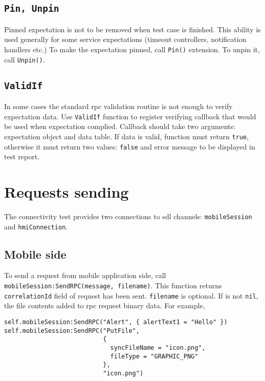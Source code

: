 \documentclass{article}
\begin{document}
\subsection{\tt Pin, Unpin}
Pinned expectation is not to be removed when test case is finished.
This ability is used generally for some service expectations (timeout controllers,
notification handlers etc.)
To make the expectation pinned, call {\tt Pin()} extension.
To unpin it, call {\tt Unpin()}.
\subsection{\tt ValidIf}
In some cases the standard {\sc rpc} validation routine is not enough to verify
expectation data.
Use {\tt ValidIf} function to register verifying callback that would be used
when expectation complied.
Callback should take two arguments: expectation object and data table.
If data is valid, function must return {\tt true}, otherwise it must return
two values: {\tt false} and error message to be displayed in test report.
\section{Requests sending}
The connectivity test provides two connections to {\sc sdl} channels:
{\tt mobileSession} and {\tt hmiConnection}.

\subsection{Mobile side}
To send a request from mobile application side, call
{\tt mobileSession:SendRPC(message, filename)}.
This function returns {\tt correlationId} field of request has been sent.
{\tt filename} is optional.
If is not {\tt nil}, the file contents added to {\sc rpc} request binary data.
For example,
\begin{lstlisting}
self.mobileSession:SendRPC("Alert", { alertText1 = "Hello" })
self.mobileSession:SendRPC("PutFile",
                           {
                             syncFileName = "icon.png",
                             fileType = "GRAPHIC_PNG"
                           },
                           "icon.png")
\end{lstlisting}
\end{document}
